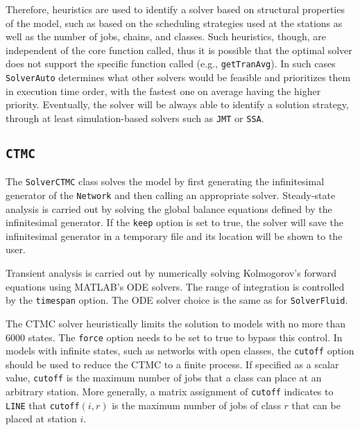 Therefore, heuristics are used to identify a solver based on structural properties of the model, such as based on the scheduling strategies used at the stations as well as the number of jobs, chains, and classes. Such heuristics, though, are independent of the core function called, thus it is possible that the optimal solver does not  support the specific function called (e.g., \texttt{getTranAvg}). In such cases \texttt{SolverAuto} determines what other solvers would be feasible and prioritizes them in execution time order, with the fastest one on average having the higher priority. Eventually, the solver will be always able to identify a solution strategy, through at least simulation-based solvers such as \texttt{JMT} or \texttt{SSA}.

\subsection{\texttt{CTMC}}
The \texttt{SolverCTMC} class solves the model by first generating the infinitesimal generator of the \texttt{Network} and then calling an appropriate solver. Steady-state analysis is carried out by solving the global balance equations defined by the infinitesimal generator. If the \texttt{keep} option is set to true, the solver will save the infinitesimal generator in a temporary file and its location will be shown to the user.

Transient analysis is carried out by numerically solving Kolmogorov's forward equations using MATLAB's ODE solvers. The range of integration is controlled by the \texttt{timespan} option. The ODE solver choice is the same as for \texttt{SolverFluid}.

The CTMC solver heuristically limits the solution to models with no more than 6000 states. The \texttt{force} option needs to be set to true to bypass this control. In models with infinite states, such as networks with open classes, the \texttt{cutoff} option should be used to reduce the CTMC to a finite process. If specified as a scalar value, \texttt{cutoff} is the maximum number of jobs that a class can place at an arbitrary station. More generally, a matrix assignment of \texttt{cutoff} indicates to \texttt{LINE} that \texttt{cutoff}$(i,r)$ is the maximum number of jobs of class $r$ that can be placed at station $i$.



